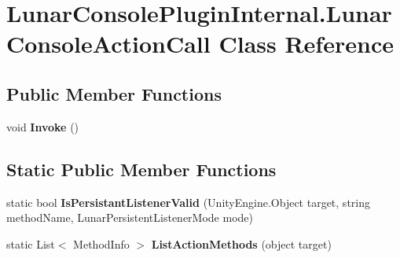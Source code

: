 \hypertarget{class_lunar_console_plugin_internal_1_1_lunar_console_action_call}{}\section{Lunar\+Console\+Plugin\+Internal.\+Lunar\+Console\+Action\+Call Class Reference}
\label{class_lunar_console_plugin_internal_1_1_lunar_console_action_call}
\subsection*{Public Member Functions}
\begin{DoxyCompactItemize}
\item 
\mbox{\label{class_lunar_console_plugin_internal_1_1_lunar_console_action_call_a491c092ce926601a6e14d0564e8cb3da}} 
void {\bfseries Invoke} ()
\end{DoxyCompactItemize}
\subsection*{Static Public Member Functions}
\begin{DoxyCompactItemize}
\item 
\mbox{\label{class_lunar_console_plugin_internal_1_1_lunar_console_action_call_ab4eb223d10a3cc5d80f4ee8abb9d4aca}} 
static bool {\bfseries Is\+Persistant\+Listener\+Valid} (Unity\+Engine.\+Object target, string method\+Name, Lunar\+Persistent\+Listener\+Mode mode)
\item 
\mbox{\label{class_lunar_console_plugin_internal_1_1_lunar_console_action_call_abe39bccb1057c465a157162c3c6e2384}} 
static List$<$ Method\+Info $>$ {\bfseries List\+Action\+Methods} (object target)
\end{DoxyCompactItemize}
